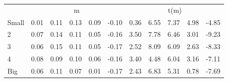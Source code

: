 \begin{table}[!ht]
\begin{tabular}{lrrrrrrrrrr}
      & \multicolumn{5}{c}{m} & \multicolumn{5}{c}{t(m)}
    
    \\
      \cmidrule(r){2-6} \cmidrule(r){7-11}

    Small   & 0.01  & 0.11  & 0.13  & 0.09  & -0.10  & 0.36  & 6.55  & 7.37  & 4.98  & -4.85  \\
         2  & 0.07  & 0.14  & 0.11  & 0.05  & -0.16  & 3.50  & 7.78  & 6.46  & 3.01  & -9.23  \\
         3  & 0.06  & 0.15  & 0.11  & 0.05  & -0.17  & 2.52  & 8.09  & 6.09  & 2.63  & -8.33  \\
         4  & 0.08  & 0.09  & 0.10  & 0.06  & -0.16  & 3.40  & 4.48  & 6.04  & 3.16  & -7.11  \\
    Big     & 0.06  & 0.11  & 0.07  & 0.01  & -0.17  & 2.43  & 6.83  & 5.31  & 0.78  & -7.69  \\

  

  \bottomrule
\end{tabular}
\label{tbl:25_Size_Inv_C97b}
\end{table}